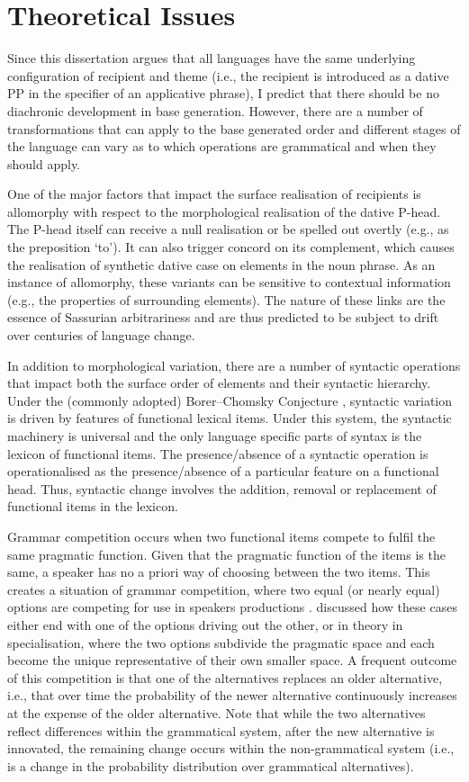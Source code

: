\section{Theoretical Issues}
	Since this dissertation argues that all languages have the same underlying configuration of recipient and theme (i.e., the recipient is introduced as a dative PP in the specifier of an applicative phrase), I predict that there should be no diachronic development in base generation. However, there are a number of transformations that can apply to the base generated order and different stages of the language can vary as to which operations are grammatical and when they should apply.

	One of the major factors that impact the surface realisation of recipients is allomorphy with respect to the morphological realisation of the dative P-head. The P-head itself can receive a null realisation or be spelled out overtly (e.g., as the preposition `to'). It can also trigger concord on its complement, which causes the realisation of synthetic dative case on elements in the noun phrase. As an instance of allomorphy, these variants can be sensitive to contextual information (e.g., the properties of surrounding elements). The nature of these links are the essence of Sassurian arbitrariness and are thus predicted to be subject to drift over centuries of language change.

	In addition to morphological variation, there are a number of syntactic operations that impact both the surface order of elements and their syntactic hierarchy. Under the (commonly adopted) Borer--Chomsky Conjecture \citep{Baker.2008}, syntactic variation is driven by features of functional lexical items. Under this system, the syntactic machinery is universal and the only language specific parts of syntax is the lexicon of functional items. The presence/absence of a syntactic operation is operationalised as the presence/absence of a particular feature on a functional head. Thus, syntactic change involves the addition, removal or replacement of functional items in the lexicon.

	Grammar competition occurs when two functional items compete to fulfil the same pragmatic function. Given that the pragmatic function of the items is the same, a speaker has no a priori way of choosing between the two items. This creates a situation of grammar competition, where two equal (or nearly equal) options are competing for use in speakers productions \citep{Kroch.1989}. \cite{Wallenberg.2013} discussed how these cases either end with one of the options driving out the other, or in theory in specialisation, where the two options subdivide the pragmatic space and each become the unique representative of their own smaller space. A frequent outcome of this competition is that one of the alternatives replaces an older alternative, i.e., that over time the probability of the newer alternative continuously increases at the expense of the older alternative. Note that while the two alternatives reflect differences within the grammatical system, after the new alternative is innovated, the remaining change occurs within the non-grammatical system (i.e., is a change in the probability distribution over grammatical alternatives).

